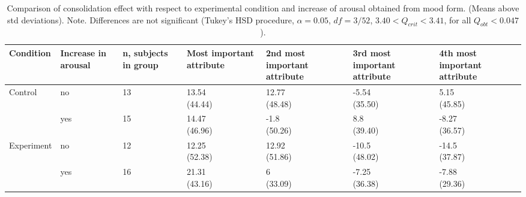 



\begin{table*}
  \centering
  \small
  \begingroup
    \begin{tabularx}{\textwidth}{XXXXXXX}
      \toprule

      Condition
      & Increase in arousal
      & n, subjects in group
      & Most important attribute
      & 2nd most important attribute
      & 3rd most important attribute
      & 4th most important attribute
      \\

      \midrule


      Control
      & no
      & 13
      & \cellcontent{13.54\\(44.44)}
      & \cellcontent{12.77\\(48.48)}
      & \cellcontent{-5.54\\(35.50)}
      & \cellcontent{5.15\\(45.85)}
      \\

      & yes
      & 15
      & \cellcontent{14.47\\(46.96)}
      & \cellcontent{-1.8\\(50.26)}
      & \cellcontent{8.8\\(39.40)}
      & \cellcontent{-8.27\\(36.57)}
      \\

      Experiment
      & no
      & 12
      & \cellcontent{12.25\\(52.38)}
      & \cellcontent{12.92\\(51.86)}
      & \cellcontent{-10.5\\(48.02)}
      & \cellcontent{-14.5\\(37.87)}
      \\

      & yes
      & 16
      & \cellcontent{21.31\\(43.16)}
      & \cellcontent{6\\(33.09)}
      & \cellcontent{-7.25\\(36.38)}
      & \cellcontent{-7.88\\(29.36)}
      \\

      \bottomrule
    \end{tabularx}
    \endgroup
  \caption{Comparison of consolidation effect with respect to
    experimental condition and increase of arousal obtained from mood
    form. (Means above std deviations). Note. Differences are not
    significant (Tukey's HSD procedure, $\alpha=0.05$, $df = 3/52$,
    $3.40 < Q_{crit} < 3.41$, for all $Q_{obt}<0.047$).\label{tab:arousal}}
\end{table*}



